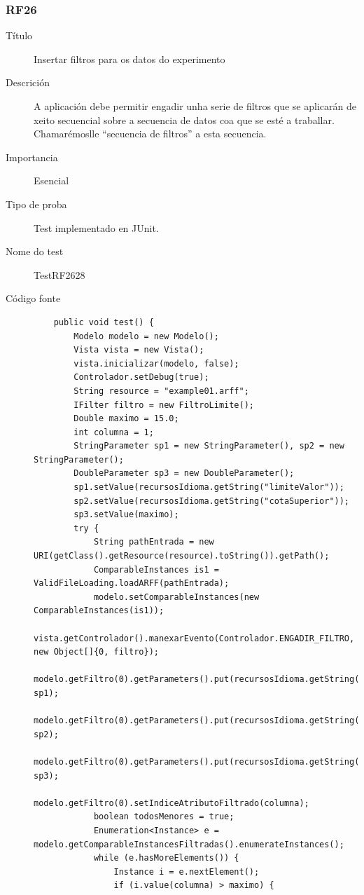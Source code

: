 \subsubsection*{RF26}
\begin{description}
\item[Título] \hfill
Insertar filtros para os datos do experimento
\item[Descrición] \hfill
A aplicación debe permitir engadir unha serie de filtros que se aplicarán de xeito secuencial sobre a secuencia de datos coa que se esté a traballar. Chamarémoslle ``secuencia de filtros'' a esta secuencia.
\item[Importancia] \hfill
Esencial
\item[Tipo de proba] \hfill
Test implementado en JUnit.
\item[Nome do test] \hfill
TestRF2628
\item[Código fonte]
\begin{lstlisting}
    public void test() {
        Modelo modelo = new Modelo();
        Vista vista = new Vista();
        vista.inicializar(modelo, false);
        Controlador.setDebug(true);
        String resource = "example01.arff";
        IFilter filtro = new FiltroLimite();
        Double maximo = 15.0;
        int columna = 1;
        StringParameter sp1 = new StringParameter(), sp2 = new StringParameter();
        DoubleParameter sp3 = new DoubleParameter();
        sp1.setValue(recursosIdioma.getString("limiteValor"));
        sp2.setValue(recursosIdioma.getString("cotaSuperior"));
        sp3.setValue(maximo);
        try {
            String pathEntrada = new URI(getClass().getResource(resource).toString()).getPath();
            ComparableInstances is1 = ValidFileLoading.loadARFF(pathEntrada);
            modelo.setComparableInstances(new ComparableInstances(is1));
            vista.getControlador().manexarEvento(Controlador.ENGADIR_FILTRO, new Object[]{0, filtro});
            modelo.getFiltro(0).getParameters().put(recursosIdioma.getString("tipoLimite"), sp1);
            modelo.getFiltro(0).getParameters().put(recursosIdioma.getString("tipoCota"), sp2);
            modelo.getFiltro(0).getParameters().put(recursosIdioma.getString("valor"), sp3);
            modelo.getFiltro(0).setIndiceAtributoFiltrado(columna);
            boolean todosMenores = true;
            Enumeration<Instance> e = modelo.getComparableInstancesFiltradas().enumerateInstances();
            while (e.hasMoreElements()) {
                Instance i = e.nextElement();
                if (i.value(columna) > maximo) {

\end{lstlisting}
\end{description}
